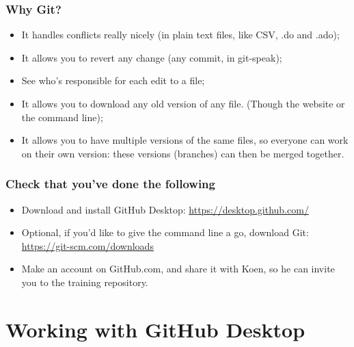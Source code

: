 \documentclass{beamer}
\begin{document}

\begin{frame}
	\frametitle{Why Git?}
	\begin{itemize}
		\item It handles conflicts really nicely (in plain text files, like CSV, .do and .ado);
		\item It allows you to revert any change (any commit, in git-speak);
		\item See who's responsible for each edit to a file;
		\item It allows you to download any old version of any file. (Though the website or the command line);
		\item It allows you to have multiple versions of the same files, so everyone can work on their own version: these versions (branches) can then be merged together.
	\end{itemize}
\end{frame}


\begin{frame}
\frametitle{Check that you've done the following}
	\begin{itemize}
		\item Download and install GitHub Desktop: \url{https://desktop.github.com/}
		\item Optional, if you'd like to give the command line a go, download Git: \url{https://git-scm.com/downloads} 
		\item Make an account on GitHub.com, and share it with Koen, so he can invite you to the training repository.
	\end{itemize}
\end{frame}

\section{Working with GitHub Desktop}

\end{document}
